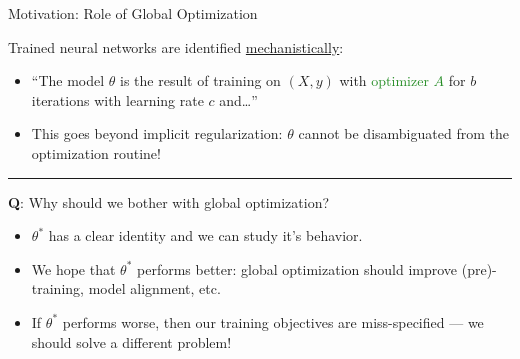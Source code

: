 \documentclass[usenames,dvipsnames,notheorems]{beamer}
\newcommand{\horizontalrule}{
	{
			\vspace{-0.5em}
			\center \rule{\textwidth}{0.1em}
			\vspace{-0.2em}
		}
}
\newcommand{\green}[1]{\textcolor{ForestGreen}{#1}}
\newcommand{\bad}[1]{\textcolor{bad}{#1}}
\newcommand{\good}[1]{\textcolor{good}{#1}}
\begin{document}
\begin{frame}{Motivation: Role of Global Optimization}

	Trained neural networks are identified \underline{mechanistically}:
	\vspace{1ex}
	\pause

	\begin{itemize}
		\item ``The model \( \theta \) is the result of training
		      on \( (X, y) \) with
		      \green{optimizer \( A \)} for
		      \textcolor{brightpink}{\( b \) iterations} with
		      \textcolor{ultramarine}{learning rate \( c \)}
		      and\ldots''
		      \vspace{1ex}
		      \pause

		\item This goes beyond \bad{implicit regularization}:
		      \( \theta \) cannot be disambiguated from the
		      optimization routine!
	\end{itemize}

	\pause
	\horizontalrule

	\textbf{Q}: Why should we bother with global optimization?

	\vspace{1ex}
	\pause

	\begin{itemize}
		\item \( \theta^* \) has a \good{clear identity} and we
		      can study it's behavior.
		      \vspace{1ex}
		      \pause

		\item We hope that \( \theta^* \) \good{performs better}:
		      global optimization should improve (pre)-training, model alignment, etc.

		      \vspace{1ex}
		      \pause

		\item If \( \theta^* \) \bad{performs worse}, then our training
		      objectives are \good{miss-specified} --- we should solve a
		      different problem!
	\end{itemize}
\end{frame}
\end{document}
